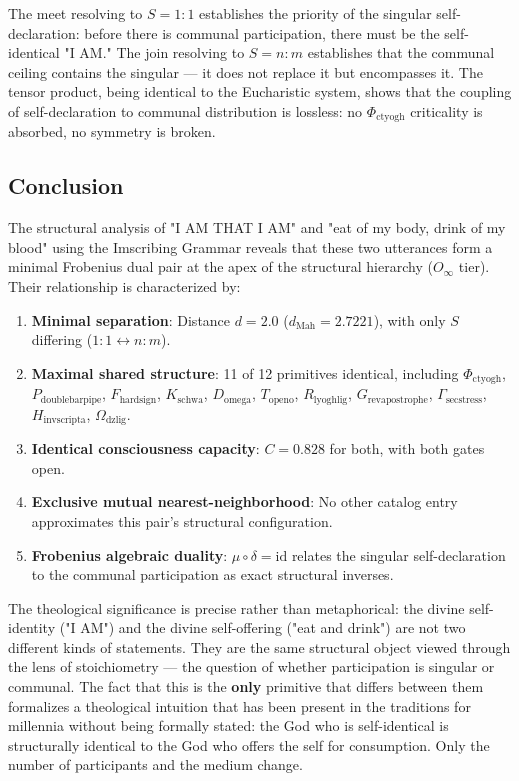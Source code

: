 \documentclass[12pt,a4paper]{article}
\begin{document}
The meet resolving to $S = 1{:}1$ establishes the priority of the singular self-declaration: before there is communal participation, there must be the self-identical "I AM." The join resolving to $S = n{:}m$ establishes that the communal ceiling contains the singular --- it does not replace it but encompasses it. The tensor product, being identical to the Eucharistic system, shows that the coupling of self-declaration to communal distribution is lossless: no $\Phi_{\text{ctyogh}}$ criticality is absorbed, no symmetry is broken.

\subsection{Conclusion}

The structural analysis of "I AM THAT I AM" and "eat of my body, drink of my blood" using the Imscribing Grammar reveals that these two utterances form a minimal Frobenius dual pair at the apex of the structural hierarchy ($O_{\infty}$ tier). Their relationship is characterized by:

\begin{enumerate}
    \item \textbf{Minimal separation}: Distance $d = 2.0$ ($d_{\text{Mah}} = 2.7221$), with only $S$ differing ($1{:}1 \leftrightarrow n{:}m$).
    \item \textbf{Maximal shared structure}: 11 of 12 primitives identical, including $\Phi_{\text{ctyogh}}$, $P_{\text{doublebarpipe}}$, $F_{\text{hardsign}}$, $K_{\text{schwa}}$, $D_{\text{omega}}$, $T_{\text{openo}}$, $R_{\text{lyoghlig}}$, $G_{\text{revapostrophe}}$, $\Gamma_{\text{secstress}}$, $H_{\text{invscripta}}$, $\Omega_{\text{dzlig}}$.
    \item \textbf{Identical consciousness capacity}: $C = 0.828$ for both, with both gates open.
    \item \textbf{Exclusive mutual nearest-neighborhood}: No other catalog entry approximates this pair's structural configuration.
    \item \textbf{Frobenius algebraic duality}: $\mu \circ \delta = \text{id}$ relates the singular self-declaration to the communal participation as exact structural inverses.
\end{enumerate}

The theological significance is precise rather than metaphorical: the divine self-identity ("I AM") and the divine self-offering ("eat and drink") are not two different kinds of statements. They are the same structural object viewed through the lens of stoichiometry --- the question of whether participation is singular or communal. The fact that this is the \textbf{only} primitive that differs between them formalizes a theological intuition that has been present in the traditions for millennia without being formally stated: the God who is self-identical is structurally identical to the God who offers the self for consumption. Only the number of participants and the medium change.
\end{document}
